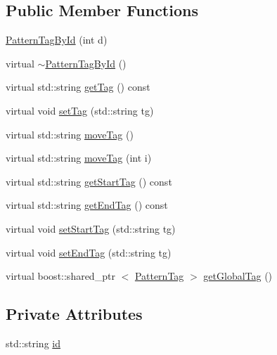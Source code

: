 \subsection*{\-Public \-Member \-Functions}
\begin{DoxyCompactItemize}
\item 
\hyperlink{classcryomesh_1_1state_1_1PatternTagById_a2c11f41ca6f8ab4a65fa63e250fd2660}{\-Pattern\-Tag\-By\-Id} (int d)
\item 
virtual \hyperlink{classcryomesh_1_1state_1_1PatternTagById_a67999e382d416f40ccdcb4be2d491ced}{$\sim$\-Pattern\-Tag\-By\-Id} ()
\item 
virtual std\-::string \hyperlink{classcryomesh_1_1state_1_1PatternTagById_acee63d4183580398eb30161dfbb3a88d}{get\-Tag} () const 
\item 
virtual void \hyperlink{classcryomesh_1_1state_1_1PatternTagById_a5cfba8a1a26501eb671f186c0b47ff0c}{set\-Tag} (std\-::string tg)
\item 
virtual std\-::string \hyperlink{classcryomesh_1_1state_1_1PatternTagById_aa8146b29d5b9448d9a73fde4f18c1b70}{move\-Tag} ()
\item 
virtual std\-::string \hyperlink{classcryomesh_1_1state_1_1PatternTagById_a27fb4f51f07766bd1715b5c8b31454ee}{move\-Tag} (int i)
\item 
virtual std\-::string \hyperlink{classcryomesh_1_1state_1_1PatternTagById_ac2624633ba018f4ad1ae229278cfe198}{get\-Start\-Tag} () const 
\item 
virtual std\-::string \hyperlink{classcryomesh_1_1state_1_1PatternTagById_a9d5f9cc34fd14d895ce235cea35aebe8}{get\-End\-Tag} () const 
\item 
virtual void \hyperlink{classcryomesh_1_1state_1_1PatternTagById_a9adf0ade652a4e48acd264e11e10e3b7}{set\-Start\-Tag} (std\-::string tg)
\item 
virtual void \hyperlink{classcryomesh_1_1state_1_1PatternTagById_a02e3ef3349001a9cba60cb5e0fc150cd}{set\-End\-Tag} (std\-::string tg)
\item 
virtual boost\-::shared\-\_\-ptr\*
$<$ \hyperlink{classcryomesh_1_1state_1_1PatternTag}{\-Pattern\-Tag} $>$ \hyperlink{classcryomesh_1_1state_1_1PatternTagById_ac3dbe345fe252b9ab9feafa995e91474}{get\-Global\-Tag} ()
\end{DoxyCompactItemize}
\subsection*{\-Private \-Attributes}
\begin{DoxyCompactItemize}
\item 
std\-::string \hyperlink{classcryomesh_1_1state_1_1PatternTagById_a9470fbc97fc84afd2eeae7b5e9166715}{id}
\end{DoxyCompactItemize}
